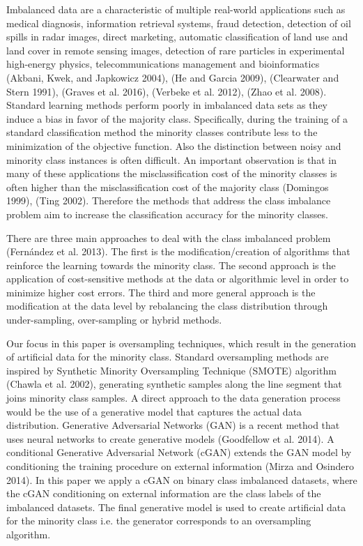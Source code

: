 \documentclass[parskip=full]{scrartcl}
\begin{document}
Imbalanced data are a characteristic of multiple real-world applications such as
medical diagnosis, information retrieval systems, fraud detection, detection of
oil spills in radar images, direct marketing, automatic classification of land
use and land cover in remote sensing images, detection of rare particles in
experimental high-energy physics, telecommunications management and
bioinformatics (Akbani, Kwek, and Japkowicz 2004), (He and Garcia 2009),
(Clearwater and Stern 1991), (Graves et al. 2016), (Verbeke et al. 2012), (Zhao
et al. 2008). Standard learning methods perform poorly in imbalanced data sets
as they induce a bias in favor of the majority class. Specifically, during the
training of a standard classification method the minority classes contribute
less to the minimization of the objective function. Also the distinction between
noisy and minority class instances is often difficult. An important observation
is that in many of these applications the misclassification cost of the minority
classes is often higher than the misclassification cost of the majority class
(Domingos 1999), (Ting 2002). Therefore the methods that address the class
imbalance problem aim to increase the classification accuracy for the minority
classes. 
 
There are three main approaches to deal with the class imbalanced problem
(Fernández et al. 2013). The first is the modification/creation of algorithms
that reinforce the learning towards the minority class. The second approach is
the application of cost-sensitive methods at the data or algorithmic level in
order to minimize higher cost errors. The third and more general approach is the
modification at the data level by rebalancing the class distribution through
under-sampling, over-sampling or hybrid methods.  

Our focus in this paper is oversampling techniques, which result in the
generation of artificial data for the minority class. Standard oversampling
methods are inspired by Synthetic Minority Oversampling Technique (SMOTE)
algorithm (Chawla et al. 2002), generating synthetic samples along the line
segment that joins minority class samples. A direct approach to the data
generation process would be the use of a generative model that captures the
actual data distribution. Generative Adversarial Networks (GAN) is a recent
method that uses neural networks to create generative models (Goodfellow et al.
2014). A conditional Generative Adversarial Network (cGAN) extends the GAN model
by conditioning the training procedure on external information (Mirza and
Osindero 2014). In this paper we apply a cGAN on binary class imbalanced
datasets, where the cGAN conditioning on external information are the class
labels of the imbalanced datasets. The final generative model is used to create
artificial data for the minority class i.e. the generator corresponds to an
oversampling algorithm.
\end{document}
